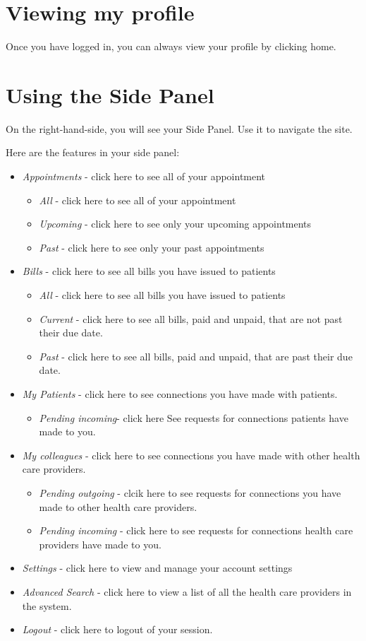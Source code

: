 \documentclass[12pt]{report}
\begin{document}
\section{Viewing my profile}
Once you have logged in, you can always view your profile by clicking home.
\section{Using the Side Panel}
On the right-hand-side, you will see your Side Panel. Use it to navigate the site.

Here are the features in your side panel:
\begin{itemize}
\item \textit{Appointments} - click here to see all of your appointment
\begin{itemize}
\item \textit{All} - click here to see all of your appointment
\item \textit{Upcoming} - click here to see only your upcoming appointments
\item \textit{Past} - click here to see only your past appointments
\end{itemize}
\item \textit{Bills} - click here to see all bills you have issued to patients
\begin{itemize} 
\item \textit{All} - click here to see all bills you have issued to patients
\item \textit{Current} - click here to see all bills, paid and unpaid, that are not past their due date.
\item \textit{Past}  - click here to see all bills, paid and unpaid, that are past their due date.
\end{itemize}
\item \textit{My Patients} - click here to see connections you have made with patients.
\begin{itemize}
\item \textit{Pending incoming}- click here See requests for connections patients have made to you.
\end{itemize}
\item \textit{My colleagues} - click here to see connections you have made with other health care providers.
\begin{itemize}
\item \textit{Pending outgoing} - clcik here to see requests for connections you have made to other health care providers.
\item \textit{Pending incoming} - click here to see requests for connections health care providers have made to you.
\end{itemize}
\item \textit{Settings} - click here to view and manage your account settings
\item \textit{Advanced Search} - click here to view a list of all the health care providers in the system.
\item \textit{Logout} - click here to logout of your session.
\end{itemize}
\end{document}
